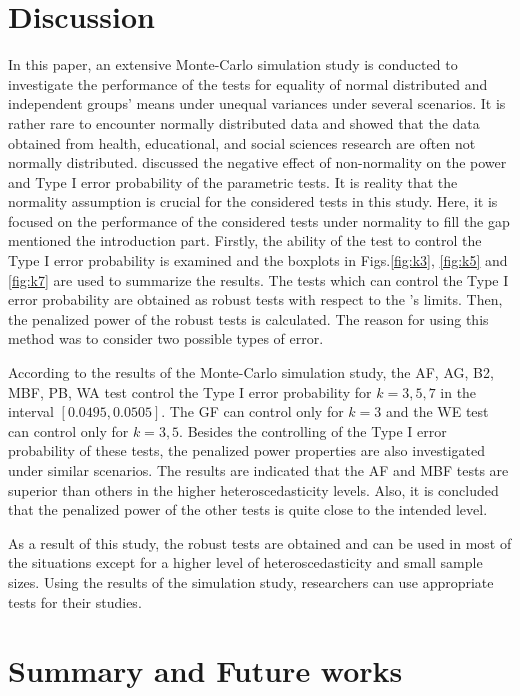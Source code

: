 \section{Discussion}

In this paper, an extensive Monte-Carlo simulation study is conducted to investigate the performance of the tests for equality of normal distributed and independent groups' means under unequal variances under several scenarios. It is rather rare to encounter normally distributed data and \cite{bono:2017} showed that the data obtained from health, educational, and social sciences research are often not normally distributed. \cite{blanca:2013} discussed the negative effect of non-normality on the power and Type I error probability of the parametric tests. It is reality that the normality assumption is crucial for the considered tests in this study. Here, it is focused on the performance of the considered tests under normality to fill the gap mentioned the introduction part. Firstly, the ability of the test to control the Type I error probability is examined and the boxplots in Figs.\ref{fig:k3}, \ref{fig:k5} and \ref{fig:k7} are used to summarize the results. The tests which can control the Type I error probability are obtained as robust tests with respect to the \cite{bradley:1978}'s limits. Then, the penalized power of the robust tests is calculated. The reason for using this method was to consider two possible types of error.

According to the results of the Monte-Carlo simulation study, the AF, AG, B2, MBF, PB, WA test control the Type I error probability for $k=3, 5, 7$ in the interval $[0.0495, 0.0505]$. The GF can control only for $k=3$ and the WE test can control only for $k=3, 5$. Besides the controlling of the Type I error probability of these tests, the penalized power properties are also investigated under similar scenarios. The results are indicated that the AF and MBF tests are superior than others in the higher heteroscedasticity levels. Also, it is concluded that the penalized power of the other tests is quite close to the intended level. 

As a result of this study, the robust tests are obtained and can be used in most of the situations except for a higher level of heteroscedasticity and small sample sizes. Using the results of the simulation study, researchers can use appropriate tests for their studies.

\section{Summary and Future works}


